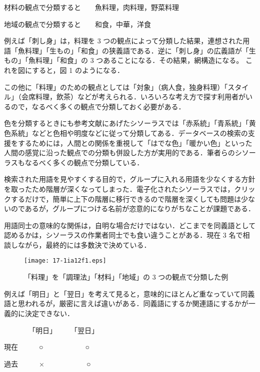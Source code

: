 \documentclass[japanese]{jnlp_1.4}
\begin{document}
材料の観点で分類すると　　魚料理，肉料理，野菜料理

地域の観点で分類すると　　和食，中華，洋食

例えば「刺し身」は，料理を 3 つの観点によって分類した結果，連想された用語「魚料理」「生もの」「和食」の狭義語である．逆に「刺し身」の広義語が「生もの」「魚料理」「和食」の 3 つあることになる．その結果，網構造になる。
これを図にすると，図 1 のようになる．

この他に「料理」のための観点としては「対象」（病人食，独身料理）「スタイル」（会席料理，飲茶）などが考えられる．いろいろな考え方で探す利用者がいるので，なるべく多くの観点で分類しておく必要がある．


色を分類するときにも参考文献にあげたシソーラスでは「赤系統」「青系統」「黄色系統」などと色相や明度などに従って分類してある．データベースの検索の支援をするためには，人間との関係を重視して「はでな色」「暖かい色」といった人間の感覚に沿った観点での分類も併設した方が実用的である．筆者らのシソーラスもなるべく多くの観点で分類している．

検索された用語を見やすくする目的で，グループに入れる用語を少なくする方針を取ったため階層が深くなってしまった．電子化されたシソーラスでは，クリックするだけで，簡単に上下の階層に移行できるので階層を深くしても問題は少ないのであるが，グループにつける名前が恣意的になりがちなことが課題である．

\nopagebreak

用語同士の意味的な関係は，自明な場合だけではない．どこまでを同義語として認めるかは，シソーラスの作業者同士でも食い違うことがある．現在 3 名で相談しながら，最終的には多数決で決めている．

\begin{figure}[t]
 \begin{center}
  \texttt{[image: 17-1ia12f1.eps]}
 \end{center}
 \caption{「料理」を「調理法」「材料」「地域」の 3 つの観点で分類した例}
 \label{fig:one}
\end{figure}

例えば「明日」と「翌日」を考えて見ると，意味的にほとんど重なっていて同義語と思われるが，厳密に言えば違いがある．同義語にするか関連語にするかが一義的に決定できない．

　　　　「明日」　　　「翌日」

現在　　　○　　　　　　○

過去　　　×　　　　　　○
\end{document}
